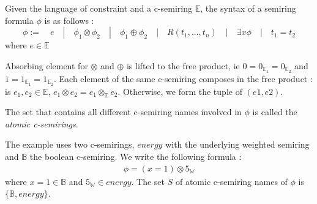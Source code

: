 

\begin{definition}
	Given the language of constraint and a c-semiring $\mathbb{E} $, the syntax of a semiring formula $\phi$ is as follows :
	$$ 
		\phi := \quad e \quad | \quad \phi_1 \otimes \phi_2 \quad | \quad \phi_1 \oplus \phi_2 \quad | \quad R(t_1,...,t_n) \quad | \quad \exists x \phi \quad | \quad t_1 = t_2 
	$$
	where $e \in \mathbb{E}$
\end{definition}
Absorbing element for $\otimes$ and $\oplus$ is lifted to the free product, ie $0 = 0_{\mathbb{E}_1}= 0_{\mathbb{E}_2}$ and $1 = 1_{\mathbb{E}_1}= 1_{\mathbb{E}_2}$. Each element of the same c-semiring composes in the free product : is $e_1,e_2 \in \mathbb{E}$,  $e_1 \otimes e_2= e_1 \otimes_{\mathbb{E}}e_2$. Otherwise, we form the tuple of $(e1,e2)$.


The set that contains all different c-semiring names involved in $\phi$ is called the \textit{atomic c-semirings}.
\begin{example}
	The example uses two c-semirings, $energy$ with the underlying weighted semiring and $\mathbb{B}$ the boolean c-semiring. We write the following formula :
	\begin{align*}
		\phi = (x=1) \otimes 5_{\mathbb{W}}
	\end{align*}
	where $x=1 \in \mathbb{B}$ and $5_{\mathbb{W}} \in energy$.
	The set $S$ of atomic c-semiring names of $\phi$ is $\{\mathbb{B},energy\}$.
\end{example}


